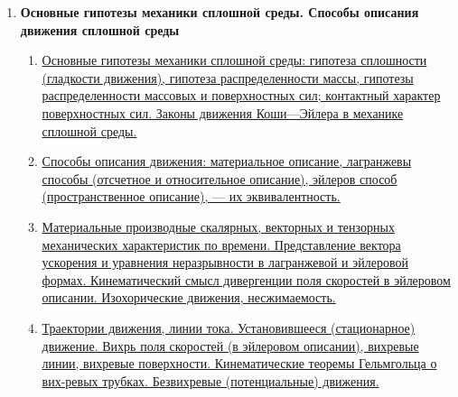 \documentclass[a4paper,12pt]{article}
\begin{document}
\begin{enumerate}
\begin{enumerate}
\end{enumerate}
\item \textbf{Основные гипотезы механики сплошной среды. Способы описания движения сплошной среды}
\begin{enumerate}
\item \hyperlink{bil2_1}{Основные гипотезы механики сплошной среды: гипотеза сплошности (гладкости движения), гипотеза распределенности массы, гипотезы распределенности массовых и поверхностных сил; контактный характер поверхностных сил. Законы движения Коши—Эйлера в механике сплошной среды.}
\item \hyperlink{bil2_2}{Способы описания движения: материальное описание, лагранжевы способы (отсчетное и относительное описание), эйлеров способ (пространственное описание), — их эквивалентность. }
\item \hyperlink{bil2_3}{Материальные производные скалярных, векторных и тензорных механических характеристик по времени. Представление вектора ускорения и уравнения неразрывности в лагранжевой и эйлеровой формах. Кинематический смысл дивергенции поля скоростей в эйлеровом описании. Изохорические движения, несжимаемость. }
\item \hyperlink{bil2_4}{Траектории движения, линии тока. Установившееся (стационарное) движение. Вихрь поля скоростей (в эйлеровом описании), вихревые линии, вихревые поверхности. Кинематические теоремы Гельмгольца о вих-ревых трубках. Безвихревые (потенциальные) движения.}
\end{enumerate}


\end{enumerate}
\end{document}
